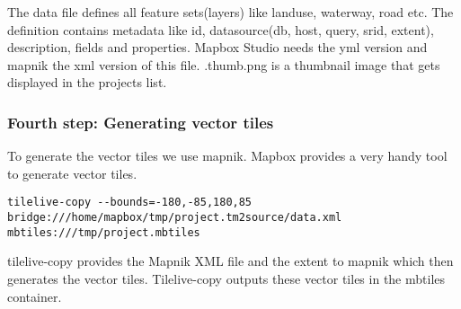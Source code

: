 The data file defines all feature sets(layers) like landuse, waterway,
road etc. The definition contains metadata like id, datasource(db, host,
query, srid, extent), description, fields and properties. Mapbox Studio
needs the yml version and mapnik the xml version of this file.
.thumb.png is a thumbnail image that gets displayed in the projects
list.

\subsubsection{Fourth step: Generating vector
tiles}\label{fourth-step-generating-vector-tiles}

To generate the vector tiles we use mapnik. Mapbox provides a very handy
tool to generate vector tiles.

\begin{verbatim}
tilelive-copy --bounds=-180,-85,180,85 bridge:///home/mapbox/tmp/project.tm2source/data.xml mbtiles:///tmp/project.mbtiles
\end{verbatim}

tilelive-copy provides the Mapnik XML file and the extent to mapnik
which then generates the vector tiles. Tilelive-copy outputs these
vector tiles in the mbtiles container.
